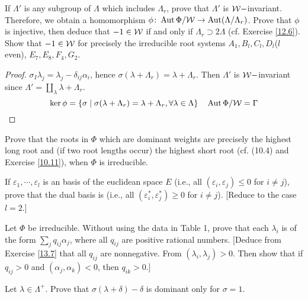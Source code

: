 \begin{ex}
  If $\Lambda'$ is any subgroup of $\Lambda$ which includes $\Lambda_r$, prove that $\Lambda'$ is ${\cal W}-$invariant. Therefore, we obtain a homomorphism $\phi\colon \operatorname{Aut}\Phi/{\cal W} \to \operatorname{Aut}(\Lambda/\Lambda_r)$. Prove that $\phi$ is injective, then deduce that $ -1\in {\cal W}$ if and only if $\Lambda_r \supset 2\Lambda$ (cf. Exercise \ref{12.6}). Show that $ -1\in{\cal W}$ for precisely the irreducible root systems $A_1,B_l,C_l,D_l$($l$ even), $E_7, E_8,  F_4, G_2$.
\end{ex}
\begin{proof}
  $\sigma_I\lambda_j=\lambda_j-\delta_{ij}\alpha_i$, hence $\sigma(\lambda+\Lambda_r)=\lambda+\Lambda_r$. Then $\Lambda'$ is ${\cal W}-$invariant since $\Lambda'=\coprod\limits_{\lambda}\lambda+\Lambda_r$.
  \begin{equation*}
    \ker\phi=\{\sigma\mid \sigma(\lambda+\Lambda_r)=\lambda+\Lambda_r, \forall \lambda\in\Lambda\}\quad \operatorname{Aut}\Phi/{\cal W}=\Gamma
  \end{equation*}
  
\end{proof}

\begin{ex}
  Prove that the roots in $\Phi$ which are dominant weights are precisely the highest long root and (if two root lengths occur) the highest short root (cf. (10.4) and Exercise \ref{10.11}), when $\Phi$ is irreducible.
\end{ex}

\begin{ex}\label{13.7}
  If $\varepsilon_1, \cdots, \varepsilon_l$ is an  basis of the euclidean space $E$ (i.e., all $(\varepsilon_i, \varepsilon_j) \leqslant 0$ for $i \neq j$), prove that the dual basis is  (i.e., all $(\varepsilon^{\ast}_i, \varepsilon^{\ast}_j) \geqslant 0$ for $i \neq j$). [Reduce to the case $l = 2$.]
\end{ex}

\begin{ex}
  Let $\Phi$ be irreducible. Without using the data in Table 1, prove that each $\lambda_i$ is of the form $\sum \limits_j q_{ij}\alpha_j$, where all $q_{ij}$ are positive rational numbers. [Deduce from Exercise \ref{13.7} that all $q_{ij}$ are nonnegative. From $(\lambda_i, \lambda_j) > 0$. Then show that if $q_{ij} > 0$ and $(\alpha_j, \alpha_k) < 0$, then $q_{ik} > 0$.]
\end{ex}

\begin{ex}
  Let $\lambda\in \Lambda^{+}$. Prove that $\sigma(\lambda + \delta) - \delta$ is dominant only for $\sigma = 1$.
\end{ex}

